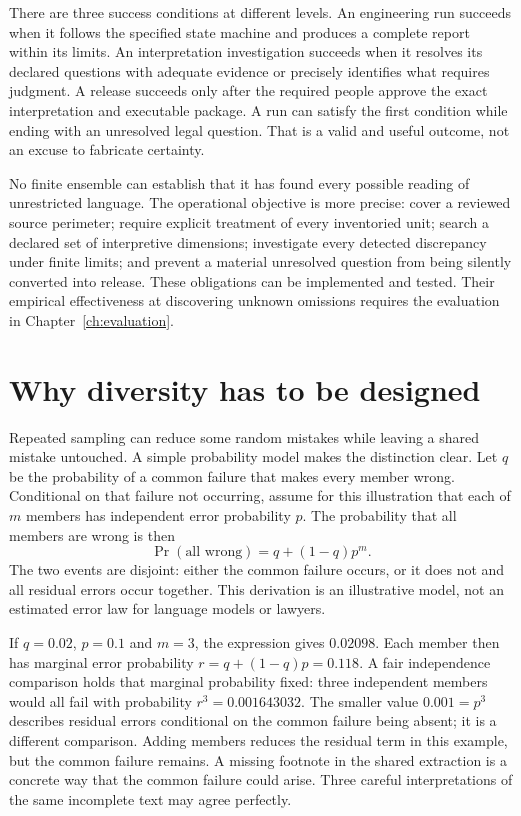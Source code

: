 \documentclass[12pt,a4paper,oneside,openany]{book}
\begin{document}
There are three success conditions at different levels. An engineering run
succeeds when it follows the specified state machine and produces a complete
report within its limits. An interpretation investigation succeeds when it
resolves its declared questions with adequate evidence or precisely identifies
what requires judgment. A release succeeds only after the required people approve
the exact interpretation and executable package. A run can satisfy the first
condition while ending with an unresolved legal question. That is a valid and
useful outcome, not an excuse to fabricate certainty.

No finite ensemble can establish that it has found every possible reading of
unrestricted language. The operational objective is more precise: cover a
reviewed source perimeter; require explicit treatment of every inventoried unit;
search a declared set of interpretive dimensions; investigate every detected
discrepancy under finite limits; and prevent a material unresolved question from
being silently converted into release. These obligations can be implemented and
tested. Their empirical effectiveness at discovering unknown omissions requires
the evaluation in Chapter~\ref{ch:evaluation}.

\section{Why diversity has to be designed}
\label{merge:M06:01}


Repeated sampling can reduce some random mistakes while leaving a shared mistake
untouched. A simple probability model makes the distinction clear. Let $q$ be the
probability of a common failure that makes every member wrong. Conditional on
that failure not occurring, assume for this illustration that each of $m$ members
has independent error probability $p$. The probability that all members are wrong
is then
\begin{equation}
 \Pr(\text{all wrong})=q+(1-q)p^m.
 \label{eq:common-error}
\end{equation}
The two events are disjoint: either the common failure occurs, or it does not and
all residual errors occur together. This derivation is an illustrative model,
not an estimated error law for language models or lawyers.

If $q=0.02$, $p=0.1$ and $m=3$, the expression gives $0.02098$. Each
member then has marginal error probability $r=q+(1-q)p=0.118$. A fair
independence comparison holds that marginal probability fixed: three
independent members would all fail with probability $r^3=0.001643032$.
The smaller value $0.001=p^3$ describes residual errors conditional on
the common failure being absent; it is a different comparison. Adding
members reduces the residual term in this example, but the common failure
remains. A missing footnote in the shared extraction is a concrete way that the
common failure could arise. Three careful interpretations of the same incomplete
text may agree perfectly.
\end{document}
